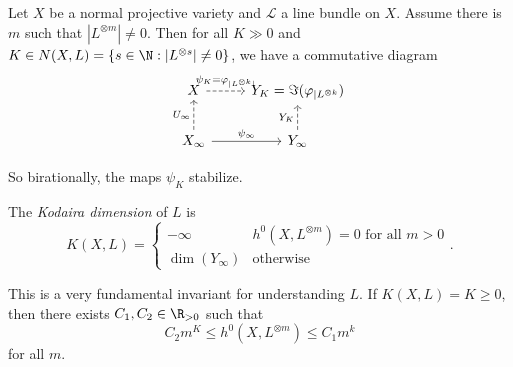 \documentclass[a4paper]{article}
\begin{document}
\begin{thm}[Jitaka] %
  Let $X$ be a normal projective variety and $\mathcal{L}$ a line bundle on $X$. Assume there is $m$ such that $|L^{\otimes m}| \not= 0$. Then for all $K \gg 0$ and $K \in N(X, L) = \{s \in \N: |L^{\otimes s}| \not= 0\}$, we have a commutative diagram
  \[
    \begin{tikzcd}
      X \ar[r, dashed, "\psi_K = \varphi_{|L^{\otimes k}|}"] & Y_K = \Im (\varphi_{|L^{\otimes k}})\\
      X_\infty \ar[u, "U_\infty", dashed] \ar[r, "\psi_\infty"] & Y_\infty \ar[u, "Y_K", dashed]
    \end{tikzcd} %
  \]
\end{thm}
So birationally, the maps $\psi_K$ stabilize.

\begin{defi}
  The \emph{Kodaira dimension} of $L$ is
  \[
    K(X, L) =
    \begin{cases}
      -\infty & h^0(X, L^{\otimes m}) = 0\text{ for all }m > 0\\
      \dim (Y_\infty) & \text{otherwise}
    \end{cases}.
  \]
\end{defi}
This is a very fundamental invariant for understanding $L$. If $K(X, L) = K \geq 0$, then there exists $C_1, C_2 \in \R_{>0}$ such that
\[
  C_2 m^K \leq h^0(X, L^{\otimes m}) \leq C_1 m^k
\]
for all $m$.

\printindex
\end{document}
